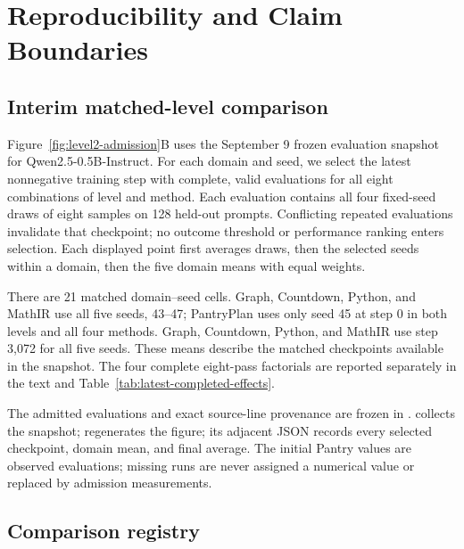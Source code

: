 \documentclass{article}
\newcommand{\1}{\mathbf 1}
\theoremstyle{remark}
\theoremstyle{definition}
\theoremstyle{plain}
\begin{document}
\section{Reproducibility and Claim Boundaries}
\label{app:reproducibility}

\subsection{Interim matched-level comparison}
\label{app:level2-interim}

Figure~\ref{fig:level2-admission}B uses the September 9 frozen evaluation
snapshot for Qwen2.5-0.5B-Instruct. For each domain and seed, we select the
latest nonnegative training step with complete, valid evaluations for all
eight combinations of level and method. Each evaluation contains all four
fixed-seed draws of eight samples on 128 held-out prompts. Conflicting
repeated evaluations invalidate that checkpoint; no outcome threshold or
performance ranking enters selection. Each displayed point first averages
draws, then the selected seeds within a domain, then the five domain means
with equal weights.

There are 21 matched domain--seed cells. Graph, Countdown, Python, and MathIR
use all five seeds, 43--47; PantryPlan uses only seed 45 at step 0 in both
levels and all four methods. Graph, Countdown, Python, and MathIR use
step 3,072 for all five seeds. These means describe the matched checkpoints
available in the snapshot. The four complete eight-pass factorials
are reported separately in the text and Table~\ref{tab:latest-completed-effects}.

The admitted evaluations and exact source-line provenance are frozen in
.
 collects the snapshot;
 regenerates the figure;
its adjacent JSON records every selected checkpoint, domain mean, and final
average. The initial Pantry values are observed evaluations; missing runs
are never assigned a numerical value or replaced by admission measurements.

\subsection{Comparison registry}
\label{app:program-registry}
\end{document}
